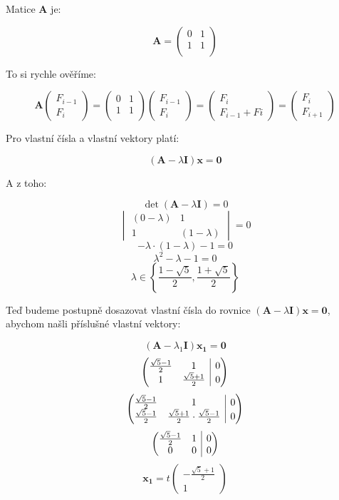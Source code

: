 \documentclass{fkssolpub}
\makeatletter
\newenvironment{amatrix}[1]{%
  \left(\begin{array}{@{}*{#1}{c}|c@{}}
}{%
  \end{array}\right)
}
\makeatother
\begin{document}
Matice $\mathbf{A}$ je:

\[
  \mathbf{A} = \begin{pmatrix}
    0 & 1 \\
    1 & 1 \\
  \end{pmatrix}
\]

To si rychle ověříme:

\[
  \mathbf{A} \begin{pmatrix}
    F_{i - 1} \\
    F_{i}
  \end{pmatrix} = \begin{pmatrix}
    0 & 1 \\
    1 & 1 \\
  \end{pmatrix} \begin{pmatrix}
    F_{i - 1} \\
    F_{i}
  \end{pmatrix} = \begin{pmatrix}
    F_i \\ F_{i - 1} + F{i}
  \end{pmatrix} = \begin{pmatrix}
    F_i \\ F_{i + 1}
  \end{pmatrix}
\]

Pro vlastní čísla a vlastní vektory platí:

\[
  (\mathbf{A} - \lambda \mathbf{I}) \mathbf{x} = \mathbf{0}
\]

A z toho:

\[
  \det (\mathbf{A} - \lambda \mathbf{I}) = 0
\]
\[
  \begin{vmatrix}
    (0 - \lambda) & 1 \\
    1 & (1 - \lambda)
  \end{vmatrix}  = 0
\]
\[
  - \lambda \cdot (1 - \lambda) - 1 = 0
\]
\[
  \lambda^2 - \lambda - 1 = 0
\]
\[
  \lambda \in \left\{\frac{1 - \sqrt{5}}{2}, \frac{1 + \sqrt{5}}{2}\right\}
\]

Teď budeme postupně dosazovat vlastní čísla do rovnice $(\mathbf{A} - \lambda \mathbf{I}) \mathbf{x} = \mathbf{0}$, abychom našli příslušné vlastní vektory:

\[
  (\mathbf{A} - \lambda_1 \mathbf{I}) \mathbf{x_1} = \mathbf{0}
\]
\[
  \begin{amatrix}{2}
    \frac{\sqrt{5} - 1}{2} & 1 & 0 \\
    1 & \frac{\sqrt{5} + 1}{2} & 0
  \end{amatrix}
\]
\[
  \begin{amatrix}{2}
    \frac{\sqrt{5} - 1}{2} & 1 & 0 \\
    \frac{\sqrt{5} - 1}{2} & \frac{\sqrt{5} + 1}{2} \cdot \frac{\sqrt{5} - 1}{2} & 0
  \end{amatrix}
\]
\[
  \begin{amatrix}{2}
    \frac{\sqrt{5} - 1}{2} & 1 & 0 \\
    0 & 0 & 0
  \end{amatrix}
\]
\[
  \mathbf{x_1} = t \begin{pmatrix}
    - \frac{\sqrt{5} + 1}{2} \\ 1
  \end{pmatrix}
\]
\end{document}
